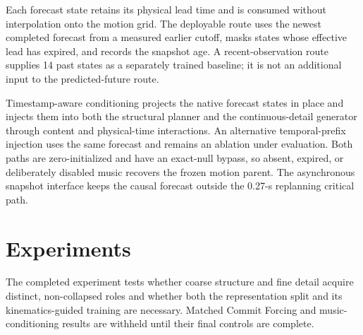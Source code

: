 \documentclass[conference]{IEEEtran}
\newcommand{\cof}{Commit Forcing}
\newif\ifshowpapertodos
\newcommand{\papertodo}[1]{%
\ifshowpapertodos
\par\smallskip\noindent
{\color{red!75!black}\textbf{TODO:} #1}
\smallskip\par
\fi}
\begin{document}
Each forecast state retains its physical lead time and is consumed without interpolation onto the motion grid. The deployable route uses the newest completed forecast from a measured earlier cutoff, masks states whose effective lead has expired, and records the snapshot age. A recent-observation route supplies 14 past states as a separately trained baseline; it is not an additional input to the predicted-future route.

Timestamp-aware conditioning projects the native forecast states in place and injects them into both the structural planner and the continuous-detail generator through content and physical-time interactions. An alternative temporal-prefix injection uses the same forecast and remains an ablation under evaluation. Both paths are zero-initialized and have an exact-null bypass, so absent, expired, or deliberately disabled music recovers the frozen motion parent. The asynchronous snapshot interface keeps the causal forecast outside the 0.27-s replanning critical path.

\papertodo{Complete and freeze the ListenAhead-MRT2 control matrix before admitting a
music claim. Select routes, checkpoints, and hyperparameters on validation data only;
then checksum one complete held-out source manifest before inspecting final metrics or
renders. Compare unconditional, static-now, observed-history, predicted-future, and
oracle-future routes on every eligible track with matched seeds and durations. Report
paired track-level effects and 95\% confidence intervals at 30 and 60 s. Predicted
future must improve music adaptation over both causal controls without degrading dance
quality. No source, seed, or metric may be reselected after test evaluation.}

\section{Experiments}
The completed experiment tests whether coarse structure and fine detail acquire distinct, non-collapsed roles and whether both the representation split and its kinematics-guided training are necessary. Matched \cof{} and music-conditioning results are withheld until their final controls are complete.
\end{document}
